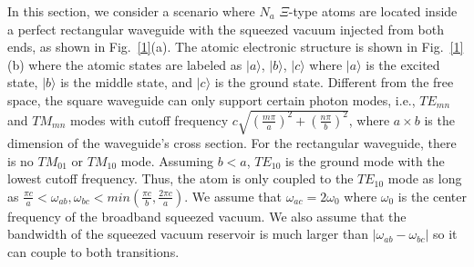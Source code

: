 \documentclass[aps,showpacs,twocolumn,twoside,groupedaddress]{revtex4}
\begin{document}
In this section, we consider a scenario where $N_a$ $\Xi$-type atoms are located inside a perfect rectangular waveguide with the squeezed vacuum injected from both ends, as shown in Fig.~\ref{1}(a). The atomic electronic structure is shown in Fig.~\ref{1}(b) where the atomic states are labeled as $|a\rangle$, $|b\rangle$, $|c\rangle$ where $|a\rangle$ is the excited state,  $|b\rangle$ is the middle state, and $|c\rangle$ is the ground state. Different from the free space, the square waveguide can only support certain photon modes, i.e., $TE_{mn}$ and $TM_{mn}$ modes with cutoff frequency $c\sqrt{(\frac{m\pi}{a})^{2}+(\frac{n\pi}{b})^{2}}$, where $a \times b$ is the dimension of the waveguide's cross section. For the rectangular waveguide, there is no $TM_{01}$ or $TM_{10}$ mode. Assuming $b<a$, $TE_{10}$ is the ground mode with the lowest cutoff frequency. Thus, the atom is only coupled to the $TE_{10}$ mode as long as $\frac{\pi c}{a}<\omega_{ab},\omega_{bc}<min(\frac{\pi c}{b},\frac{2\pi c}{a})$. We assume that $\omega_{ac}=2\omega_0$ where $\omega_0$ is the center frequency of the broadband squeezed vacuum. We also assume that the bandwidth of the squeezed vacuum reservoir is much larger than $|\omega_{ab}-\omega_{bc}|$ so it can couple to both transitions. 



\end{document}
